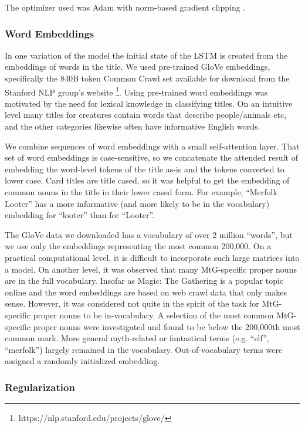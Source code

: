 \documentclass[letterpaper]{article} %
\begin{document}
The optimizer used was Adam \cite{Kingma2014AdamAM}
with norm-based gradient clipping \cite{Pascanu2012UnderstandingTE}.

\subsubsection{Word Embeddings}

In one variation of the model
the initial state of the LSTM
is created from the embeddings of words in the title.
We used pre-trained GloVe \cite{Pennington2014GloveGV} embeddings,
specifically the 840B token Common Crawl set
available for download from the Stanford NLP group's website
\footnote{https://nlp.stanford.edu/projects/glove/}.
Using pre-trained word embeddings
was motivated by the need for lexical knowledge in classifying titles.
On an intuitive level many titles for creatures
contain words that describe people/animals etc,
and the other categories likewise often have informative English words.

We combine sequences of word embeddings with a small self-attention layer.
That set of word embeddings is case-sensitive,
so we concatenate the attended result of embedding
the word-level tokens of the title as-is
and the tokens converted to lower case.
Card titles are title cased,
so it was helpful to get the embedding of common nouns in the title
in their lower cased form.
For example,
``Merfolk Looter''
has a more informative (and more likely to be in the vocabulary)
embedding for ``looter'' than for ``Looter''.

The GloVe data we downloaded has a vocabulary of over 2 million ``words'',
but we use only the embeddings representing the most common 200,000.
On a practical computational level,
it is difficult to incorporate such large matrices into a model.
On another level,
it was observed that many MtG-specific proper nouns are in the full vocabulary.
Insofar as Magic: The Gathering is a popular topic online and the word embeddings
are based on web crawl data that only makes sense.
However,
it was considered not quite in the spirit of the task
for MtG-specific proper nouns to be in-vocabulary.
A selection of the most common MtG-specific proper nouns were investigated
and found to be below the 200,000th most common mark.
More general myth-related or fantastical terms (e.g. ``elf'', ``merfolk'')
largely remained in the vocabulary.
Out-of-vocabulary terms were assigned a randomly initialized embedding.

\subsubsection{Regularization}
\end{document}
